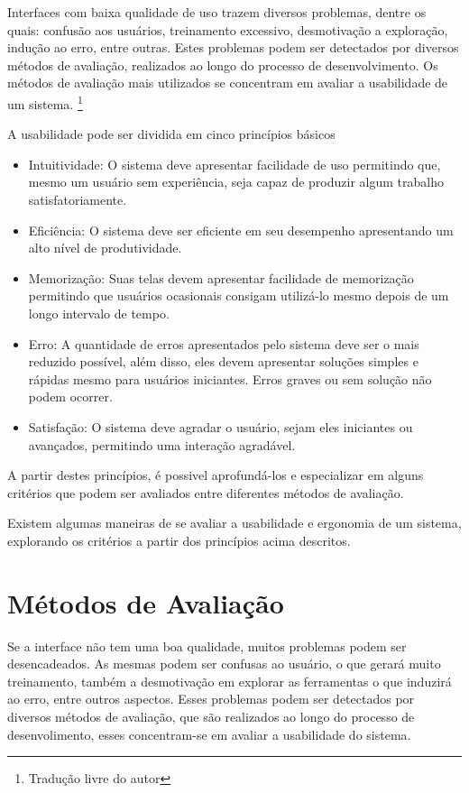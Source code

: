 Interfaces com baixa qualidade de uso trazem diversos problemas, dentre os quais:
confusão aos usuários, treinamento excessivo, desmotivação a exploração, indução ao
erro, entre outras. Estes problemas podem ser detectados por diversos métodos de
avaliação, realizados ao longo do processo de desenvolvimento. Os métodos de
avaliação mais utilizados se concentram em avaliar a usabilidade de um sistema.
\cite{maguire_context_of_use}\footnote{Tradução livre do autor}


A usabilidade pode ser dividida em cinco princípios básicos 

\begin{itemize}
  \item Intuitividade: O sistema deve apresentar facilidade de uso permitindo que, mesmo um usuário sem experiência, seja capaz de produzir algum trabalho satisfatoriamente.
  \item Eficiência: O sistema deve ser eficiente em seu desempenho apresentando um alto nível de produtividade.
  \item Memorização: Suas telas devem apresentar facilidade de memorização permitindo que usuários ocasionais consigam utilizá-lo mesmo depois de um longo intervalo de tempo.
  \item Erro: A quantidade de erros apresentados pelo sistema deve ser o mais reduzido possível, além disso, eles devem apresentar soluções simples e rápidas mesmo para usuários iniciantes. Erros graves ou sem solução não podem ocorrer.
  \item Satisfação: O sistema deve agradar o usuário, sejam eles iniciantes ou avançados, permitindo uma interação agradável.
\end{itemize}
\cite{nielsen_usabilidade}


A partir destes princípios, é possivel aprofundá-los e especializar em alguns critérios que podem ser avaliados entre diferentes métodos de avaliação.

Existem algumas maneiras de se avaliar a usabilidade e ergonomia de um sistema, explorando os critérios a partir dos princípios acima descritos.

\section{Métodos de Avaliação}

Se a interface não tem uma boa qualidade, muitos problemas podem ser desencadeados. As mesmas podem ser confusas ao usuário, o que gerará muito treinamento, também a desmotivação em explorar as ferramentas o que induzirá ao erro, entre outros aspectos.
Esses problemas podem ser detectados por diversos métodos de avaliação, que são realizados ao longo do processo de desenvolimento, esses concentram-se em avaliar a usabilidade do sistema.


